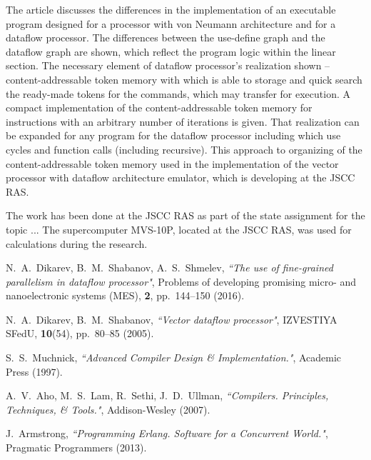 \documentclass[
11pt,%
tightenlines,%
twoside,%
onecolumn,%
nofloats,%
nobibnotes,%
nofootinbib,%
superscriptaddress,%
noshowpacs,%
centertags]%
{revtex4}
\begin{document}
The article discusses the differences in the implementation of an executable program designed for a processor with von Neumann architecture and for a dataflow processor. The differences between the use-define graph and the dataflow graph are shown, which reflect the program logic within the linear section. The necessary element of dataflow processor’s realization shown -- content-addressable token memory with which is able to storage and quick search the ready-made tokens for the commands, which may transfer for execution. A compact implementation of the content-addressable token memory for instructions with an arbitrary number of iterations is given. That realization can be expanded for any program for the dataflow processor including which use cycles and function calls (including recursive). This approach to organizing of the content-addressable token memory used in the implementation of the vector processor with dataflow architecture emulator, which is developing at the JSCC RAS.

\begin{acknowledgments}
The work has been done at the JSCC RAS as part of the state assignment for the topic ... The supercomputer MVS-10P, located at the JSCC RAS, was used for calculations during the research.
\end{acknowledgments}

\begin{thebibliography}{99}

N.~A.~Dikarev, B.~M.~Shabanov, A.~S.~Shmelev, {\it ``The use of fine-grained parallelism in dataflow processor"}, Problems of developing promising micro- and nanoelectronic systems (MES), {\bf 2}, pp.~144--150 (2016).

N.~A.~Dikarev, B.~M.~Shabanov, {\it ``Vector dataflow processor"}, IZVESTIYA SFedU, {\bf 10}(54), pp.~80--85 (2005).

S.~S.~Muchnick, {\it ``Advanced Compiler Design \& Implementation."}, Academic Press (1997).

A.~V.~Aho, M.~S.~Lam, R.~Sethi, J.~D.~Ullman, {\it ``Compilers. Principles, Techniques, \& Tools."}, Addison-Wesley (2007).

J.~Armstrong, {\it ``Programming Erlang. Software for a Concurrent World."}, Pragmatic Programmers (2013).

\end{thebibliography}
\end{document}

